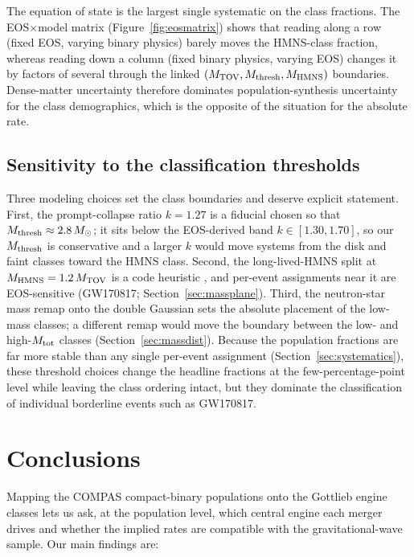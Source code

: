 \documentclass[twocolumn,amsmath]{aastex702}
\newcommand{\Msun}{M_\odot}
\newcommand{\Mtov}{M_{\rm TOV}}
\newcommand{\Mthresh}{M_{\rm thresh}}
\newcommand{\Mtot}{M_{\rm tot}}
\begin{document}
The equation of state is the largest single systematic on the class fractions.
The EOS$\times$model matrix (Figure~\ref{fig:eosmatrix}) shows that reading along
a row (fixed EOS, varying binary physics) barely moves the HMNS-class fraction,
whereas reading down a column (fixed binary physics, varying EOS) changes it by
factors of several through the linked $(\Mtov, \Mthresh, M_{\rm HMNS})$ boundaries.
Dense-matter uncertainty therefore dominates population-synthesis uncertainty for
the class demographics, which is the opposite of the situation for the absolute
rate.

\subsection{Sensitivity to the classification thresholds} \label{sec:thresholds}

Three modeling choices set the class boundaries and deserve explicit statement.
First, the prompt-collapse ratio $k = 1.27$ is a \citet{gottlieb2023} fiducial
chosen so that $\Mthresh \approx 2.8\,\Msun$; it sits below the
\citet{bauswein2013} EOS-derived band $k \in [1.30, 1.70]$, so our $\Mthresh$ is
conservative and a larger $k$ would move systems from the disk and faint classes
toward the HMNS class. Second, the long-lived-HMNS split at $M_{\rm HMNS} =
1.2\,\Mtov$ is a code heuristic \citep{margalit2017}, and per-event assignments
near it are EOS-sensitive (GW170817; Section~\ref{sec:massplane}). Third, the
neutron-star mass remap onto the \citet{alsing2018} double Gaussian
\citep{mandel2020} sets the absolute placement of the low-mass classes; a
different remap would move the boundary between the low- and high-$\Mtot$ classes
(Section~\ref{sec:massdist}). Because the population fractions are far more stable
than any single per-event assignment (Section~\ref{sec:systematics}), these
threshold choices change the headline fractions at the few-percentage-point
level while leaving the class ordering intact, but they dominate the
classification of individual borderline events such as GW170817.

\FloatBarrier
\section{Conclusions} \label{sec:conclusions}

Mapping the COMPAS compact-binary populations onto the Gottlieb engine classes
lets us ask, at the population level, which central engine each merger drives and
whether the implied rates are compatible with the gravitational-wave sample. Our
main findings are:
\end{document}
